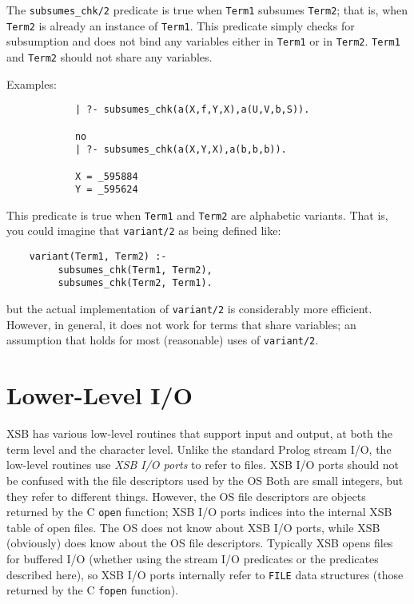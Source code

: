 \begin{description}
    The {\tt subsumes\_chk/2} predicate is true when {\tt Term1} subsumes 
    {\tt Term2}; that is, when {\tt Term2} is already an instance of
    {\tt Term1}.  This predicate simply checks for subsumption and 
    does not bind any variables either in {\tt Term1} or in {\tt Term2}.
    {\tt Term1} and {\tt Term2} should not share any variables.

    Examples:
    {\footnotesize
     \begin{verbatim}
            | ?- subsumes_chk(a(X,f,Y,X),a(U,V,b,S)).

            no
            | ?- subsumes_chk(a(X,Y,X),a(b,b,b)).

            X = _595884
            Y = _595624
     \end{verbatim}}

    This predicate is true when {\tt Term1} and {\tt Term2} are 
    alphabetic variants.  That is, you could imagine that {\tt variant/2}
    as being defined like:
    \begin{center}
    \begin{minipage}{3.5in}
    \begin{verbatim}
	variant(Term1, Term2) :-
	     subsumes_chk(Term1, Term2),
	     subsumes_chk(Term2, Term1).
    \end{verbatim}
    \end{minipage}
    \end{center}
    but the actual implementation of {\tt variant/2} is considerably more
    efficient.  However, in general, it does not work for terms that share
    variables; an assumption that holds for most (reasonable) uses of
    {\tt variant/2}.
\end{description}


\section{Lower-Level I/O}

XSB has various low-level routines that support input and output, at both
the term level and the character level.  Unlike the standard Prolog stream
I/O, the low-level routines use \emph{XSB I/O ports} to refer to files. XSB
I/O ports should not be confused with the file descriptors used by the OS
Both are small integers, but they refer to different things. However, the
OS file descriptors are objects returned by the C {\tt open} function; XSB
I/O ports indices into the internal XSB table of open files. The OS does
not know about XSB I/O ports, while XSB (obviously) does know about the OS
file descriptors. Typically XSB opens files for buffered I/O (whether using
the stream I/O predicates or the predicates described here), so XSB I/O
ports internally refer to {\tt FILE} data structures (those returned by the
C {\tt fopen} function).

